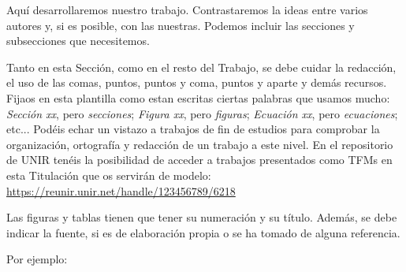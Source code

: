 Aquí desarrollaremos nuestro trabajo. Contrastaremos la ideas entre varios autores y, si es posible, con las nuestras. Podemos incluir las secciones y subsecciones que necesitemos.
\newline

Tanto en esta Sección, como en el resto del Trabajo, se debe cuidar la redacción, el uso de las comas, puntos, puntos y coma, puntos y aparte y demás recursos. Fijaos en esta plantilla como estan escritas ciertas palabras que usamos mucho: \emph{Sección xx}, pero \emph{secciones}; \emph{Figura xx}, pero \emph{figuras}; \emph{Ecuación xx}, pero \emph{ecuaciones}; etc... Podéis echar un vistazo a trabajos de fin de estudios para comprobar la organización, ortografía y redacción de un trabajo a este nivel. En el repositorio de UNIR tenéis la posibilidad de acceder a trabajos presentados como TFMs en esta Titulación que os servirán de modelo: \url{https://reunir.unir.net/handle/123456789/6218}
\newline

Las figuras y tablas tienen que tener su numeración y su título. Además, se debe indicar la fuente, si es de elaboración propia o se ha tomado de alguna referencia.
\newline

Por ejemplo: